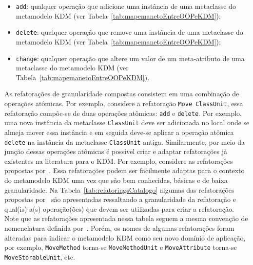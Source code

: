 
\begin{itemize}
\item \texttt{add}: qualquer operação que adicione uma instância de uma metaclasse do metamodelo KDM (ver Tabela~\ref{tab:mapemanetoEntreOOPeKDM});
\item \texttt{delete}: qualquer operação que remove uma instância de uma metaclasse do metamodelo KDM (ver Tabela~\ref{tab:mapemanetoEntreOOPeKDM});
\item \texttt{change}: qualquer operação que altere um valor de um meta-atributo de uma metaclasse do metamodelo KDM (ver Tabela~\ref{tab:mapemanetoEntreOOPeKDM}).
\end{itemize}

As refatorações de granularidade compostas consistem em uma combinação de operações atômicas. Por exemplo, considere a refatoração \texttt{Move ClassUnit}, essa refatoração compõe-se de duas operações atômicas: \texttt{add} e \texttt{delete}. Por exemplo, uma nova instância da metaclasse \texttt{ClassUnit} deve ser adicionada no local onde se almeja mover essa instância e em seguida deve-se aplicar a operação atômica \texttt{delete} na instância da metaclasse \texttt{ClassUnit} antiga. Similarmente, por meio da junção dessas operações atômicas é possível criar e adaptar refatorações já existentes na literatura para o KDM. Por exemplo, considere as refatorações propostas por~. Essa refatorações podem ser facilmente adaptas para o contexto do metamodelo KDM uma vez que são bem conhecidas, básicas e de baixa granularidade. Na Tabela~\ref{tab:refatoringsCatalogo} algumas das refatorações propostas por~ são apresentadas ressaltando a granularidade da refatoração e qual(is) a(s) operação(ões) que devem ser utilizadas para criar a refatoração. Note que as refatorações apresentada nessa tabela seguem a mesma convenção de nomenclatura definida por~. Porém, os nomes de algumas refatorações foram alteradas para indicar o metamodelo KDM como seu novo domínio de aplicação, por exemplo, \texttt{MoveMethod} torna-se \texttt{MoveMethodUnit} e \texttt{MoveAttribute} torna-se \texttt{MoveStorableUnit}, etc.


